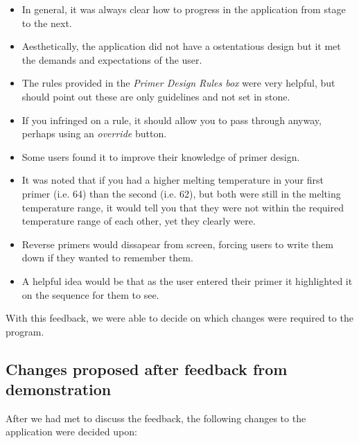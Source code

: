 \begin{itemize}

\item In general, it was always clear how to progress in the application from stage to the next.
\item Aesthetically, the application did not have a ostentatious design but it met the demands and expectations of the user.
\item The rules provided in the \emph{Primer Design Rules box} were very helpful, but should point out these are only guidelines and not set in stone.
\item If you infringed on a rule, it should allow you to pass through anyway, perhaps using an \emph{override} button.
\item Some users found it to improve their knowledge of primer design.
\item It was noted that if you had a higher melting temperature in your first primer (i.e. 64) than the second (i.e. 62), but both were still in the melting temperature range, it would tell you that they were not within the required temperature range of each other, yet they clearly were.
\item Reverse primers would dissapear from screen, forcing users to write them down if they wanted to remember them.
\item A helpful idea would be that as the user entered their primer it highlighted it on the sequence for them to see.

\end{itemize}

With this feedback, we were able to decide on which changes were required to the program.

\subsection{Changes proposed after feedback from demonstration} 

After we had met to discuss the feedback, the following changes to the application were decided upon:

